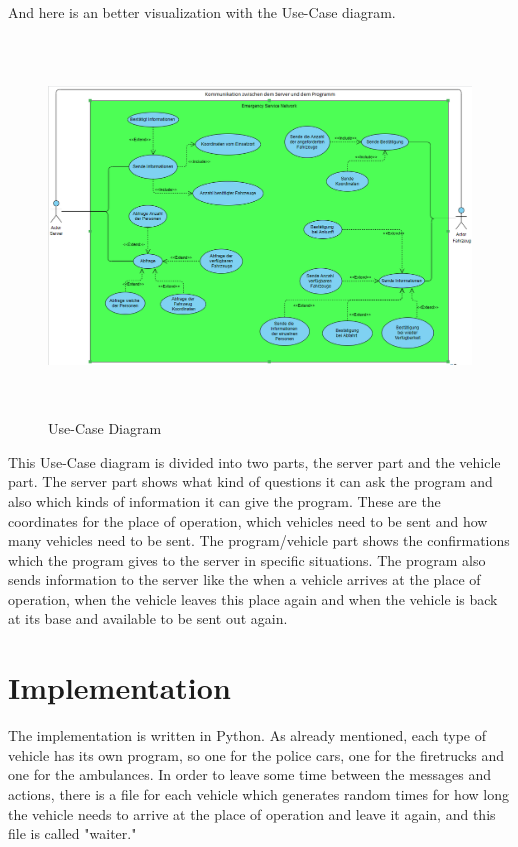 \documentclass{article}
\begin{document}
And here is an better visualization with the Use-Case diagram.
\newline
\newline
\begin{figure}[htp]
    \centering
\includegraphics[width=16cm, height=10cm]{images/Ostrzinski/UCD}
   \caption{Use-Case Diagram}
    \label{fig:GALAXY}
\end{figure}
\newline
\newline
This Use-Case diagram is divided into two parts, the server part and the vehicle part.
\newline
The server part shows what kind of questions it can ask the program and also which kinds of information it can give the program. These are the coordinates for the place of operation, which vehicles need to be sent and how many vehicles need to be sent.
\newline
The program/vehicle part shows the confirmations which the program gives to the server in specific situations. 
\newline
The program also sends information to the server like the when a vehicle arrives at the place of operation, when the vehicle leaves this place again and when the vehicle is back at its base and available to be sent out again.
\clearpage

\section{Implementation}


The implementation is written in Python. As already mentioned, each type of vehicle has its own program, so one for the police cars, one for the firetrucks and one for the ambulances. 
\newline
In order to leave some time between the messages and actions, there is a file for each vehicle which generates random times for how long the vehicle needs to arrive at the place of operation and leave it again, and this file is called "waiter."
\end{document}
